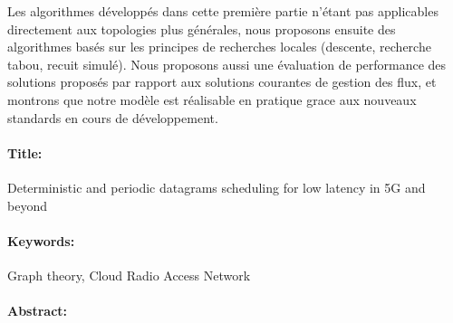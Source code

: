 \begin{mdframed}[linecolor=Prune,linewidth=1]
\begin{small}
\begin{multicols}{2}
Les algorithmes développés dans cette première partie n’étant pas applicables directement aux topologies plus générales, nous proposons ensuite des algorithmes basés sur les principes de recherches locales (descente, recherche tabou, recuit simulé).
Nous proposons aussi une évaluation de performance des solutions proposés par rapport aux solutions courantes de gestion des flux, et montrons que notre modèle est réalisable en pratique grace aux nouveaux standards en cours de développement.
\end{multicols}
\end{small}
\end{mdframed}

\begin{mdframed}[linecolor=Prune,linewidth=1]
\vspace{-.25cm}
\paragraph*{Title:} Deterministic and periodic datagrams scheduling for low latency in 5G and beyond

\begin{small}
\vspace{-.25cm}
\paragraph*{Keywords:}  Graph theory, Cloud Radio Access Network

\vspace{-.5cm}
\begin{multicols}{2}
\paragraph*{Abstract:} %



\end{multicols}
\end{small}
\end{mdframed}
